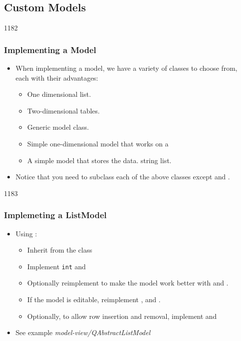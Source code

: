 \subsection{Custom Models}
\begin{slide}{1182}\frametitle{Implementing a Model}\label{model_view_creating_your_own_model}
\begin{itemize}
\item When implementing a model, we have a variety of classes to
  choose from, each with their advantages:
  \begin{itemize}
  \item {} One dimensional list.
  \item {} Two-dimensional tables.
  \item {} Generic model class.
  \item {} Simple one-dimensional model that works on a
  \item {} A simple model that stores the data.
    string list.
  \end{itemize}
\item Notice that you need to subclass each of the above classes except
   and .
\end{itemize}
\end{slide}

\begin{slide}{1183}\frametitle{Implemeting a ListModel}
\begin{itemize}
\item Using :
  \begin{itemize}
  \item Inherit from the class
  \item Implement \texttt{int}  and
      
  \item Optionally reimplement   to make the
    model work better with  and .
  \item If the model is editable, reimplement   ,
    and .
  \item Optionally, to allow row insertion and removal, implement
     and 
  \end{itemize}
\item See example \emph{model-view/QAbstractListModel}
\end{itemize}
\end{slide}

